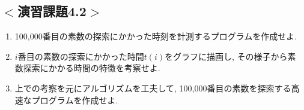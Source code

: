 \subsection*{$<$演習課題4.2$>$}
\begin{enumerate}
\item 100,000番目の素数の探索にかかった時刻を計測するプログラムを作成せよ. 
\item $i$番目の素数の探索にかかった時間$t(i)$をグラフに描画し, 
その様子から素数探索にかかる時間の特徴を考察せよ. 
\item 上での考察を元にアルゴリズムを工夫して, 100,000番目の素数を探索する高速なプログラムを作成せよ.
\end{enumerate}







